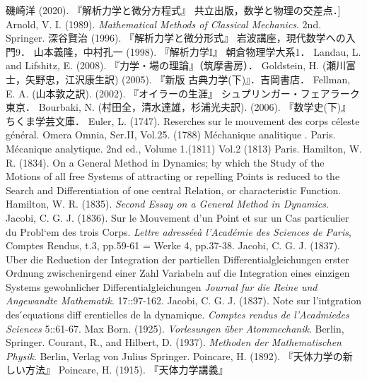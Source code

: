 \documentclass[uplatex,dvipdfmx]{jsreport}
\begin{document}
\begin{thebibliography}{99}
    磯崎洋 (2020). 『解析力学と微分方程式』 共立出版，数学と物理の交差点．]
    Arnold, V. I. (1989). \textit{Mathematical Methods of Classical Mechanics}. 2nd. Springer.
    深谷賢治 (1996). 『解析力学と微分形式』 岩波講座，現代数学への入門9．
    山本義隆，中村孔一 (1998). 『解析力学I』 朝倉物理学大系1．
    Landau, L. and Lifshitz, E. (2008). 『力学・場の理論』（筑摩書房）．
    Goldstein, H. (瀬川富士，矢野忠，江沢康生訳) (2005). 『新版 古典力学(下)』．吉岡書店．
    Fellman, E. A. (山本敦之訳). (2002). 『オイラーの生涯』 シュプリンガー・フェアラーク東京．
    Bourbaki, N. (村田全，清水達雄，杉浦光夫訳). (2006). 『数学史(下)』 ちくま学芸文庫．
    Euler, L. (1747). Reserches sur le mouvement des corps céleste général. Omera Omnia, Ser.II, Vol.25.
    (1788) Méchanique analitique . Paris.
    Mécanique analytique. 2nd ed., Volume 1.(1811) Vol.2 (1813) Paris.
    Hamilton, W. R. (1834). On a General Method in Dynamics; by which the Study of the Motions of all
    free Systems of attracting or repelling Points is reduced to the Search and Differentiation
    of one central Relation, or characteristic Function.
    Hamilton, W. R. (1835). \textit{Second Essay on a General Method in Dynamics}.
    Jacobi, C. G. J. (1836). Sur le Mouvement d’un Point et sur un Cas particulier du Probl`em des trois Corps. \textit{Lettre adresséeà l’Académie des Sciences de Paris}, Comptes Rendus, t.3, pp.59-61 = Werke 4, pp.37-38.
    Jacobi, C. G. J. (1837). Uber die Reduction der Integration der partiellen Differentialgleichungen erster Ordnung zwischenirgend einer Zahl Variabeln auf die Integration eines einzigen Systems gewohnlicher Differentialgleichungen \textit{Journal fur die Reine und Angewandte Mathematik}. 17::97-162.
    Jacobi, C. G. J. (1837). Note sur l’intgration des ́equations diff erentielles de la dynamique. \textit{Comptes rendus de l’Acadmiedes Sciences} 5::61-67.
    Max Born. (1925). \textit{Vorlesungen über Atommechanik}. Berlin, Springer.
    Courant, R., and Hilbert, D. (1937). \textit{Methoden der Mathematischen Physik}. Berlin, Verlag von Julius Springer.
    Poincare, H. (1892). 『天体力学の新しい方法』
    Poincare, H. (1915). 『天体力学講義』


\end{thebibliography}
\end{document}
